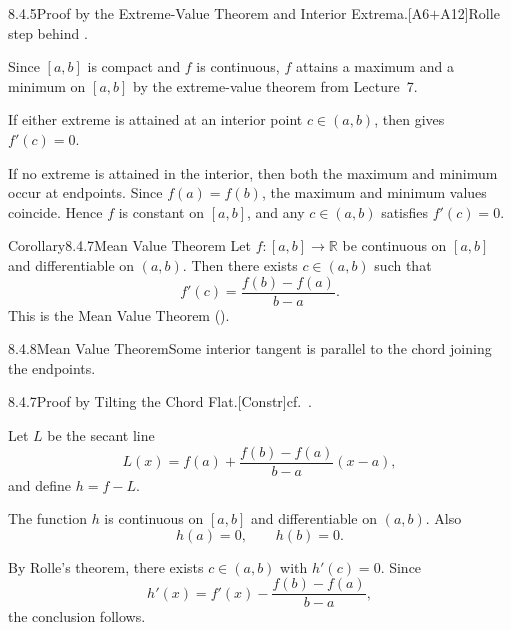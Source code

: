 \documentclass[main.tex]{subfiles}
\begin{document}
\begin{Prf}{8.4.5}{Proof by the Extreme-Value Theorem and Interior Extrema.}{[A6$+$A12]\quad Rolle step behind .}
\item Since $[a,b]$ is compact and $f$ is continuous, $f$ attains a maximum and a minimum on
  $[a,b]$ by the extreme-value theorem from Lecture~7.
\item If either extreme is attained at an interior point $c\in(a,b)$, then 
  gives $f'(c)=0$.
\item If no extreme is attained in the interior, then both the maximum and minimum occur at
  endpoints. Since $f(a)=f(b)$, the maximum and minimum values coincide. Hence $f$ is
  constant on $[a,b]$, and any $c\in(a,b)$ satisfies $f'(c)=0$.
\end{Prf}

\begin{Obj}{Corollary}{8.4.7}{Mean Value Theorem}
Let $f:[a,b]\to\mathbb R$ be continuous on $[a,b]$ and differentiable on $(a,b)$. Then
there exists $c\in(a,b)$ such that
\[
  f'(c)=\frac{f(b)-f(a)}{b-a}.
\]
This is the Mean Value Theorem ().
\end{Obj}

\begin{Fig}{8.4.8}{Mean Value Theorem}{Some interior tangent is parallel to the chord
joining the endpoints.}
\end{Fig}

\begin{Prf}{8.4.7}{Proof by Tilting the Chord Flat.}{[Constr]\quad cf.\ .}
\item Let $L$ be the secant line
  \[
    L(x)=f(a)+\frac{f(b)-f(a)}{b-a}(x-a),
  \]
  and define $h=f-L$.
\item The function $h$ is continuous on $[a,b]$ and differentiable on $(a,b)$. Also
  \[
    h(a)=0,\qquad h(b)=0.
  \]
\item By Rolle's theorem, there exists $c\in(a,b)$ with $h'(c)=0$. Since
  \[
    h'(x)=f'(x)-\frac{f(b)-f(a)}{b-a},
  \]
  the conclusion follows.
\end{Prf}
\end{document}
